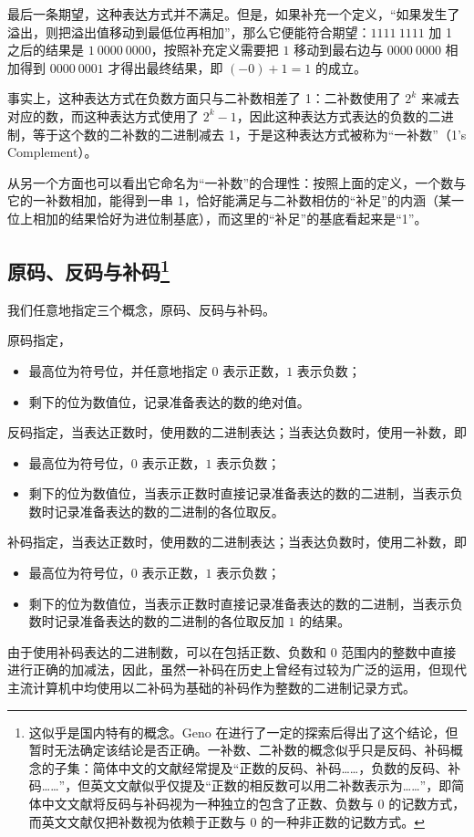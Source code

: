         最后一条期望，这种表达方式并不满足。但是，如果补充一个定义，“如果发生了溢出，则把溢出值移动到最低位再相加”，那么它便能符合期望：$1111\ 1111$ 加 1 之后的结果是 $1\ 0000\ 0000$，按照补充定义需要把 $1$ 移动到最右边与 $0000\ 0000$ 相加得到 $0000\ 0001$ 才得出最终结果，即 $(-0) + 1 = 1$ 的成立。

        事实上，这种表达方式在负数方面只与二补数相差了 1：二补数使用了 $2 ^ k$ 来减去对应的数，而这种表达方式使用了 $2 ^ k - 1$，因此这种表达方式表达的负数的二进制，等于这个数的二补数的二进制减去 1，于是这种表达方式被称为“一补数”（1's Complement）。

        从另一个方面也可以看出它命名为“一补数”的合理性：按照上面的定义，一个数与它的一补数相加，能得到一串 1，恰好能满足与二补数相仿的“补足”的内涵（某一位上相加的结果恰好为进位制基底），而这里的“补足”的基底看起来是“1”。

    \subsection[原码、反码与补码]{原码、反码与补码\footnote{这似乎是国内特有的概念。Geno 在进行了一定的探索后得出了这个结论，但暂时无法确定该结论是否正确。一补数、二补数的概念似乎只是反码、补码概念的子集：简体中文的文献经常提及“正数的反码、补码……，负数的反码、补码……”，但英文文献似乎仅提及“正数的相反数可以用二补数表示为……”，即简体中文文献将反码与补码视为一种独立的包含了正数、负数与 $0$ 的记数方式，而英文文献仅把补数视为依赖于正数与 $0$ 的一种非正数的记数方式。}}\label{subsec:NumberSystemBasics/BinaryPresentation/ChineseOnly}
        我们任意地指定三个概念，原码、反码与补码。

        原码指定，
        \begin{itemize}
            \item 最高位为符号位，并任意地指定 $0$ 表示正数，$1$ 表示负数；
            \item 剩下的位为数值位，记录准备表达的数的绝对值。
        \end{itemize}

        反码指定，当表达正数时，使用数的二进制表达；当表达负数时，使用一补数，即
        \begin{itemize}
            \item 最高位为符号位，$0$ 表示正数，$1$ 表示负数；
            \item 剩下的位为数值位，当表示正数时直接记录准备表达的数的二进制，当表示负数时记录准备表达的数的二进制的各位取反。
        \end{itemize}

        补码指定，当表达正数时，使用数的二进制表达；当表达负数时，使用二补数，即
        \begin{itemize}
            \item 最高位为符号位，$0$ 表示正数，$1$ 表示负数；
            \item 剩下的位为数值位，当表示正数时直接记录准备表达的数的二进制，当表示负数时记录准备表达的数的二进制的各位取反加 $1$ 的结果。
        \end{itemize}

        由于使用补码表达的二进制数，可以在包括正数、负数和 0 范围内的整数中直接进行正确的加减法，因此，虽然一补码在历史上曾经有过较为广泛的运用，但现代主流计算机中均使用以二补码为基础的补码作为整数的二进制记录方式。
